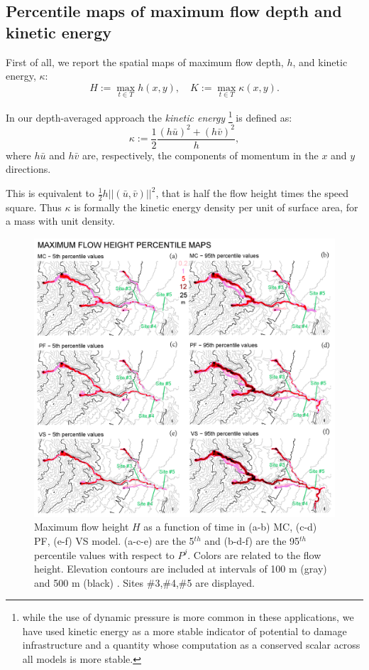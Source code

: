 \documentclass[nhess, manuscript]{copernicus}
\begin{document}
\subsection{Percentile maps of maximum flow depth and kinetic energy}
First of all, we report the spatial maps of maximum flow depth, $h$, and  kinetic energy, $\kappa$:
\begin{equation}
H:=\max_{t\in T} h(x,y), \quad K:=\max_{t\in T} \kappa(x,y).
\end{equation}

In our depth-averaged approach the \emph{kinetic energy} \footnote{while the use of dynamic pressure is more common in these applications, we have used kinetic energy as a more stable indicator of potential to damage infrastructure and a quantity whose computation as a conserved scalar across all models is more stable.} is defined as:
\begin{equation}
\kappa:=\frac{1}{2} \frac{(h\bar{u})^2+(h\bar{v})^2}{h},
\end{equation}
where $h\bar{u}$ and $h\bar{v}$ are, respectively, the components of momentum in the $x$ and $y$ directions.

This is equivalent to $\frac{1}{2} h ||(\bar{u},\bar{v})||^2$, that is half the flow height times the speed square. Thus $\kappa$ is formally the kinetic energy density per unit of surface area,  for a mass with unit density. 
\begin{figure}[H]
\centering
\includegraphics[width=1\textwidth]{Fig3.png}
\caption{Maximum flow height $H$ as a function of time in (a-b) MC, (c-d) PF, (e-f) VS model. (a-c-e) are the 5$^{th}$ and (b-d-f) are the 95$^{th}$ percentile values with respect to $P^j$. Colors are related to the flow height. Elevation contours are included at intervals of 100 m (gray) and 500 m (black) \citep{NASA2014}. Sites \#3,\#4,\#5 are displayed.}
\label{Fig3}
\end{figure}
\end{document}
